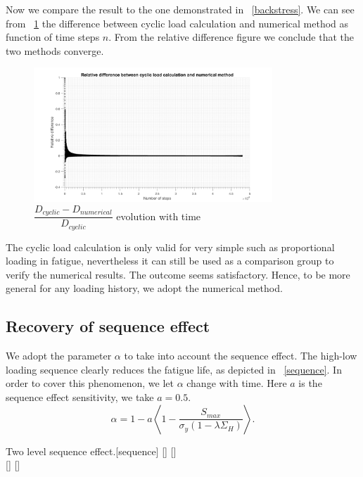 \documentclass[3p,times,number,review]{elsarticle}
\newcommand{\figref}[1]{\figurename~\ref{#1}}
\begin{document}
Now we compare the result to the one demonstrated in \figref{backstress}.  We can see from \figref{Damagediff}  the difference between cyclic load calculation and numerical method as function of time steps $n$. From the relative difference figure we conclude that the two methods converge.

\begin{figure}[!h]
	\centering
	\includegraphics[width=0.8\textwidth]{figures//Damagediff.png} 
	\caption{$\dfrac{D_{cyclic}-D_{numerical}}{D_{cyclic}}$ evolution with time}
	\label{Damagediff}
\end{figure}

The cyclic load calculation is only valid for very simple such as proportional loading in fatigue, nevertheless it can still be used as a comparison group to verify the numerical results. The outcome seems satisfactory. Hence, to be more general for any loading history, we adopt the numerical method.

\newpage
\subsection{Recovery of sequence effect}
We adopt the parameter $\alpha$ to take into account the sequence effect. The high-low loading sequence clearly reduces the fatigue life, as depicted in \figref{sequence}. In order to cover this phenomenon, we let $\alpha$ change with time. Here $a$ is the sequence effect sensitivity, we take $a=0.5$.
$$\alpha=1-a\left\langle 1-\dfrac{S_{max}}{\sigma_y\left( 1-\lambda\Sigma_{H}\right) } \right\rangle .$$

\begin{Figure}[h!]{Two level sequence effect.}[sequence]
[]
[]
\\
[]
[]
\label{sequence}
\end{Figure}
\end{document}
